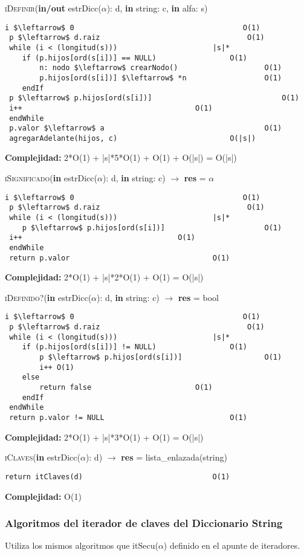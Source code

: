 \textsc{iDefinir}(\textbf{in/out} estrDicc($\alpha$): d, \textbf{in} string: c, \textbf{in} alfa: s)
\begin{lstlisting}[mathescape]
 i $\leftarrow$ 0 										O(1)
 p $\leftarrow$ d.raiz 									O(1)
 while (i < (longitud(s))) 						|s|*
 	if (p.hijos[ord(s[i])] == NULL) 				O(1)
		n: nodo $\leftarrow$ crearNodo() 					O(1)
		p.hijos[ord(s[i])] $\leftarrow$ *n 					O(1)
	endIf
 p $\leftarrow$ p.hijos[ord(s[i])] 								O(1)
 i++ 										O(1)
 endWhile
 p.valor $\leftarrow$ a 									O(1)
 agregarAdelante(hijos, c) 							O(|s|)
\end{lstlisting}
\textbf{Complejidad:} 2*O(1) + |s|*5*O(1) + O(1) + O(|s|) = O(|s|)

\textsc{iSignificado}(\textbf{in} estrDicc($\alpha$): d, \textbf{in} string: c) $\rightarrow$ \textbf{res} = $\alpha$
\begin{lstlisting}[mathescape]
 i $\leftarrow$ 0 										O(1)
 p $\leftarrow$ d.raiz 									O(1)
 while (i < (longitud(s))) 						|s|*
	p $\leftarrow$ p.hijos[ord(s[i])] 						O(1)
 i++ 									O(1)
 endWhile
 return p.valor 								O(1)
\end{lstlisting}
\textbf{Complejidad:} 2*O(1) + |s|*2*O(1) + O(1) = O(|s|)

\textsc{iDefinido?}(\textbf{in} estrDicc($\alpha$): d, \textbf{in} string: c) $\rightarrow$ \textbf{res} = bool
\begin{lstlisting}[mathescape]
 i $\leftarrow$ 0 										O(1)
 p $\leftarrow$ d.raiz 									O(1)
 while (i < (longitud(s))) 						|s|*
 	if (p.hijos[ord(s[i])] != NULL) 				O(1)
		p $\leftarrow$ p.hijos[ord(s[i])] 					O(1)
		i++ O(1)
	else
		return false 						O(1)
	endIf
 endWhile
 return p.valor != NULL 							O(1)
\end{lstlisting}
\textbf{Complejidad:} 2*O(1) + |s|*3*O(1) + O(1) = O(|s|)

\textsc{iClaves}(\textbf{in} estrDicc($\alpha$): d) $\rightarrow$ \textbf{res} = lista\_enlazada(string)
\begin{lstlisting}[mathescape]
return itClaves(d)								O(1)
\end{lstlisting}
\textbf{Complejidad:} O(1)

\subsubsection{Algoritmos del iterador de claves del Diccionario String}

Utiliza los mismos algoritmos que itSecu($\alpha$) definido en el apunte de iteradores.


